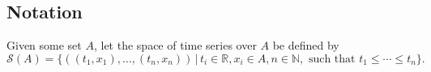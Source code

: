 \documentclass{article}
\renewcommand{\subsubsection}[1]{\textbf{#1}

} %
\newcommand{\reals}{\mathbb{R}}
\newcommand{\naturals}{\mathbb{N}}
\newcommand{\seriesspace}{\mathcal{S}}
\begin{document}
%

%
%

\subsection{Notation}
Given some set $A$, let the space of time series over $A$ be defined by
\begin{equation}
    \seriesspace(A) = \{((t_1, x_1), \ldots, (t_n, x_n)) \,\vert\, t_i \in \reals, x_i \in A, n \in \naturals, \text{ such that } t_1 \leq \cdots \leq t_n\}.\label{eq:seriesspace}
\end{equation}
\end{document}
